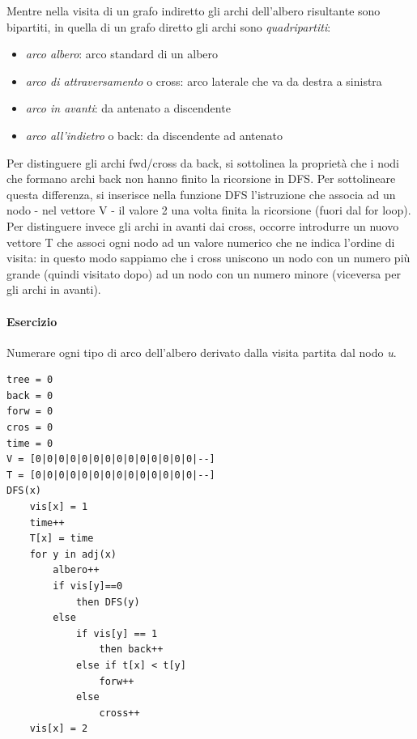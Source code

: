 Mentre nella visita di un grafo indiretto gli archi dell'albero risultante sono bipartiti, in quella di un grafo diretto gli archi sono \textit{quadripartiti}:
\begin{itemize}
	\item \textit{arco albero}: arco standard di un albero
	\item \textit{arco di attraversamento} o cross: arco laterale che va da destra a sinistra
	\item \textit{arco in avanti}: da antenato a discendente
	\item \textit{arco all'indietro} o back: da discendente ad antenato
\end{itemize} 
Per distinguere gli archi fwd/cross da back, si sottolinea la proprietà che i nodi che formano archi back non hanno finito la ricorsione in DFS.
Per sottolineare questa differenza, si inserisce nella funzione DFS l'istruzione che associa ad un nodo - nel vettore V - il valore 2 una volta finita la ricorsione (fuori dal for loop).\\
Per distinguere invece gli archi in avanti dai cross, occorre introdurre un nuovo vettore T che associ ogni nodo ad un valore numerico che ne indica l'ordine di visita: in questo modo sappiamo che i cross uniscono un nodo con un numero più grande (quindi visitato dopo) ad un nodo con un numero minore (viceversa per gli archi in avanti).
\paragraph{Esercizio}
Numerare ogni tipo di arco dell'albero derivato dalla visita partita dal nodo \textit{u}.\\
\begin{lstlisting}
tree = 0
back = 0
forw = 0
cros = 0
time = 0
V = [0|0|0|0|0|0|0|0|0|0|0|0|0|0|--]
T = [0|0|0|0|0|0|0|0|0|0|0|0|0|0|--]
DFS(x)
	vis[x] = 1 
	time++
	T[x] = time
	for y in adj(x)
		albero++
		if vis[y]==0
			then DFS(y)
		else
			if vis[y] == 1
				then back++
			else if t[x] < t[y]
				forw++
			else
				cross++
	vis[x] = 2
\end{lstlisting}
\newpage

